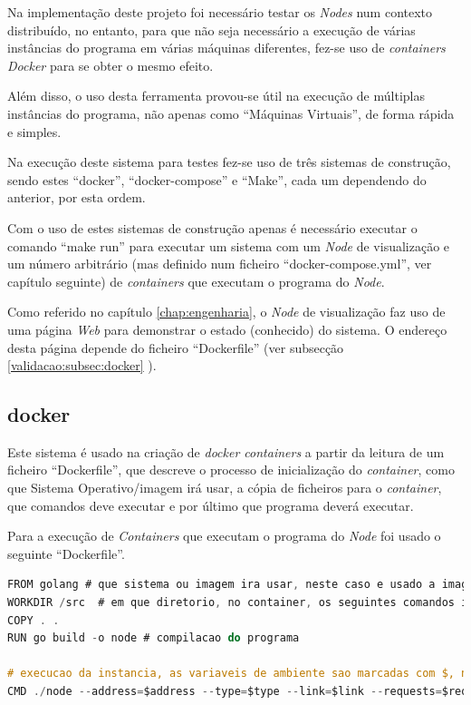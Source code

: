 Na implementação deste projeto foi necessário testar os \emph{Nodes} num contexto distribuído, no entanto, para que não seja necessário a execução de várias instâncias do programa em várias máquinas diferentes, fez-se uso de \emph{containers Docker} para se obter o mesmo efeito.

Além disso, o uso desta ferramenta provou-se útil na execução de múltiplas instâncias do programa, não apenas como ``Máquinas Virtuais'', de forma rápida e simples.

Na execução deste sistema para testes fez-se uso de três sistemas de construção, sendo estes ``docker'', ``docker-compose'' e ``Make'', cada um dependendo do anterior, por esta ordem.

Com o uso de estes sistemas de construção apenas é necessário executar o comando ``make run'' para executar um sistema com um \emph{Node} de visualização e um número arbitrário (mas definido num ficheiro ``docker-compose.yml'', ver capítulo seguinte) de \emph{containers} que executam o programa do \emph{Node}.

Como referido no capítulo \ref{chap:engenharia}, o \emph{Node} de visualização faz uso de uma página \emph{Web} para demonstrar o estado (conhecido) do sistema. O endereço desta página depende do ficheiro ``Dockerfile'' (ver subsecção 
\ref{validacao:subsec:docker}
).


\subsection*{docker}
\label{validacao:subsec:docker}
Este sistema é usado na criação de \emph{docker containers} a partir da leitura de um ficheiro ``Dockerfile'', que descreve o processo de inicialização do \emph{container}, como que Sistema Operativo/imagem irá usar, a cópia de ficheiros para o \emph{container}, que comandos deve executar e por último que programa deverá executar.


Para a execução de \emph{Containers} que executam o programa do \emph{Node} foi usado o seguinte ``Dockerfile''.
\begin{lstlisting}[caption={``Dockerfile'' do \emph{Node}},language=C]
FROM golang # que sistema ou imagem ira usar, neste caso e usado a imagem ``golang''
WORKDIR /src  # em que diretorio, no container, os seguintes comandos irao ser executados
COPY . .
RUN go build -o node # compilacao do programa

# execucao da instancia, as variaveis de ambiente sao marcadas com $, no entanto serao descritas a sua origem de seguida
CMD ./node --address=$address --type=$type --link=$link --requests=$requests --visualization=$VIS_ADDRESS
\end{lstlisting}
 

